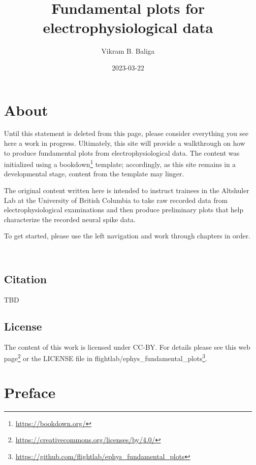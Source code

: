 \documentclass[
]{book}
\title{Fundamental plots for electrophysiological data}
\author{Vikram B. Baliga}
\date{2023-03-22}
\DeclareRobustCommand{\href}[2]{#2\footnote{\url{#1}}}
\begin{document}
\maketitle

{
\setcounter{tocdepth}{1}
\tableofcontents
}
\hypertarget{about}{%
\chapter{About}\label{about}}

Until this statement is deleted from this page, please consider everything you
see here a work in progress. Ultimately, this site will provide a walkthrough on
how to produce fundamental plots from electrophysiological data. The content
was initialized using a \href{https://bookdown.org/}{bookdown} template; accordingly,
as this site remains in a developmental stage, content from the template may
linger.

The original content written here is intended to instruct trainees in the
Altshuler Lab at the University of British Columbia to take raw recorded data
from electrophysiological examinations and then produce preliminary plots that
help characterize the recorded neural spike data.

To get started, please use the left navigation and work through chapters in
order.

🐢

\hypertarget{citation}{%
\section*{Citation}\label{citation}}

TBD

\hypertarget{license}{%
\section*{License}\label{license}}

The content of this work is licensed under CC-BY. For details please see
\href{https://creativecommons.org/licenses/by/4.0/}{this web page} or the LICENSE
file in \href{https://github.com/flightlab/ephys_fundamental_plots}{flightlab/ephys\_fundamental\_plots}.

\hypertarget{preface}{%
\chapter{Preface}\label{preface}}
\end{document}
